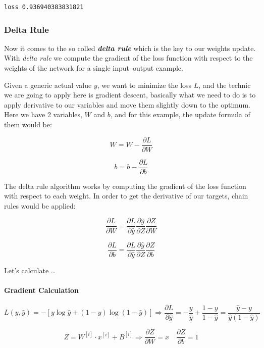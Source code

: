 \documentclass[11pt]{article}
\begin{document}
    \begin{Verbatim}[commandchars=\\\{\}]
loss 0.936940383831821
    \end{Verbatim}

    \hypertarget{delta-rule}{%
\subsubsection{Delta Rule}\label{delta-rule}}

Now it comes to the so colled \textbf{\emph{delta rule}} which is the
key to our weights update. With \emph{delta rule} we compute the
gradient of the loss function with respect to the weights of the network
for a single input--output example.

Given a generic actual value \(y\), we want to minimize the loss \(L\),
and the technic we are going to apply here is gradient descent,
basically what we need to do is to apply derivative to our variables and
move them slightly down to the optimum. Here we have 2 variables, \(W\)
and \(b\), and for this example, the update formula of them would be:

\[W = W - \frac{\partial L}{\partial W}\]

\[b = b - \frac{\partial L}{\partial b}\]

The delta rule algorithm works by computing the gradient of the loss
function with respect to each weight. In order to get the derivative of
our targets, chain rules would be applied:

\[\frac{\partial L}{\partial W} =  \frac{\partial L}{\partial \hat y} \frac{\partial \hat y}{\partial Z} \frac{\partial Z}{\partial W} \]

\[\frac{\partial L}{\partial b} =  \frac{\partial L}{\partial \hat y} \frac{\partial \hat y}{\partial Z} \frac{\partial Z}{\partial b} \]

Let's calculate \ldots{}

\hypertarget{gradient-calculation}{%
\paragraph{Gradient Calculation}\label{gradient-calculation}}

\[L(y, \hat{y}) = -[y\log{\hat{y}} + (1 - y)\log{(1 - \hat{y})}] \Rightarrow 
\frac{\partial L}{\partial \hat y} = -\frac{y}{\hat y} + \frac{1-y}{1-\hat y} = \frac{\hat y - y}{\hat y(1 - \hat y)}\]

\[ Z = W^{[i]} \cdot x^{[i]} + B^{[i]} \Rightarrow \frac{\partial Z}{\partial W} = x \quad \frac{\partial Z}{\partial b} = 1\]
\end{document}
